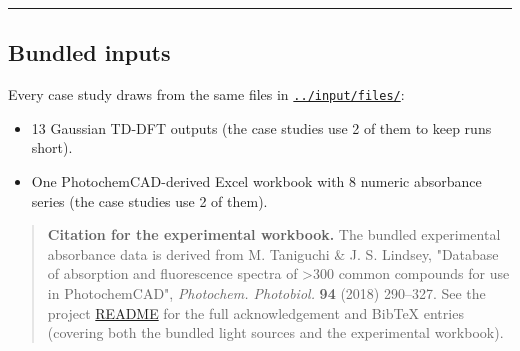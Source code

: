 \documentclass[
  11pt,
]{article}
\providecommand{\tightlist}{
  \setlength{\itemsep}{0pt}\setlength{\parskip}{0pt}}
\begin{document}
\begin{center}\rule{0.5\linewidth}{0.5pt}\end{center}

\hypertarget{bundled-inputs}{
\subsection{Bundled inputs}\label{bundled-inputs}}

Every case study draws from the same files in
\href{https://github.com/pinarsyt/overlap-calculator/blob/main/input/files}{\texttt{../input/files/}}:

\begin{itemize}
\tightlist
\item
  13 Gaussian TD-DFT outputs (the case studies use 2 of them to keep
  runs short).
\item
  One PhotochemCAD-derived Excel workbook with 8 numeric absorbance
  series (the case studies use 2 of them).
\end{itemize}

\begin{quote}
\textbf{Citation for the experimental workbook.} The bundled
experimental absorbance data is derived from M. Taniguchi \& J. S.
Lindsey, "Database of absorption and fluorescence spectra of
\textgreater300 common compounds for use in PhotochemCAD",
\emph{Photochem. Photobiol.} \textbf{94} (2018) 290--327. See the
project
\href{https://github.com/pinarsyt/overlap-calculator/blob/main/README.md\#acknowledgement-of-third-party-data}{README}
for the full acknowledgement and BibTeX entries (covering both the
bundled light sources and the experimental workbook).
\end{quote}
\end{document}
